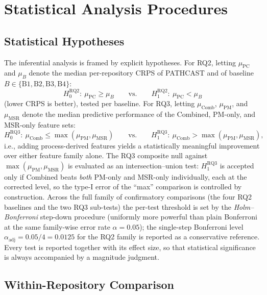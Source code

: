\section{Statistical Analysis Procedures}
\label{sec:statistical-analysis}

\subsection{Statistical Hypotheses}
\label{sec:hypotheses}

The inferential analysis is framed by explicit hypotheses. For RQ2, letting
$\mu_{\text{PC}}$ and $\mu_{B}$ denote the median per-repository CRPS of
PATHCAST and of baseline $B \in \{\text{B1},\text{B2},\text{B3},\text{B4}\}$:
\[
H_0^{\text{RQ2}}:\ \mu_{\text{PC}} \geq \mu_{B}
\qquad\text{vs.}\qquad
H_1^{\text{RQ2}}:\ \mu_{\text{PC}} < \mu_{B}
\]
(lower CRPS is better), tested per baseline. For RQ3, letting
$\mu_{\text{Comb}}$, $\mu_{\text{PM}}$, and $\mu_{\text{MSR}}$ denote the
median predictive performance of the Combined, PM-only, and MSR-only feature
sets:
\[
H_0^{\text{RQ3}}:\ \mu_{\text{Comb}} \leq \max(\mu_{\text{PM}}, \mu_{\text{MSR}})
\qquad\text{vs.}\qquad
H_1^{\text{RQ3}}:\ \mu_{\text{Comb}} > \max(\mu_{\text{PM}}, \mu_{\text{MSR}}),
\]
i.e., adding process-derived features yields a statistically meaningful
improvement over either feature family alone. The RQ3 composite null against
$\max(\mu_{\text{PM}}, \mu_{\text{MSR}})$ is evaluated as an
intersection--union test: $H_1^{\text{RQ3}}$ is accepted only if Combined
beats \emph{both} PM-only and MSR-only individually, each at the corrected
level, so the type-I error of the ``max'' comparison is controlled by
construction. Across the full family of confirmatory comparisons (the four
RQ2 baselines and the two RQ3 sub-tests) the per-test threshold is set by
the \emph{Holm--Bonferroni} step-down procedure (uniformly more powerful
than plain Bonferroni at the same family-wise error rate
$\alpha = 0.05$); the single-step Bonferroni level
$\alpha_{\text{adj}} = 0.05/4 = 0.0125$ for the RQ2 family is reported as a
conservative reference. Every test is reported together with its effect
size, so that statistical significance is always accompanied by a magnitude
judgment.

\subsection{Within-Repository Comparison}
\label{sec:within-repo}

